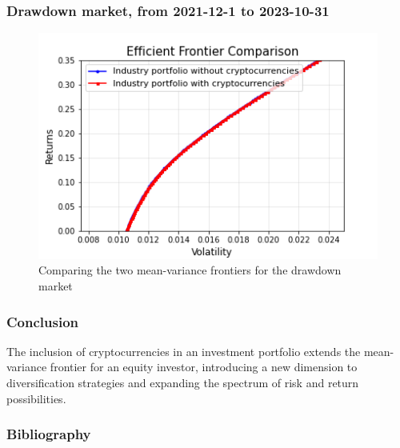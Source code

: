 \documentclass{beamer}
\begin{document}
\begin{frame}
\frametitle{Drawdown market, from 2021-12-1 to 2023-10-31}
\begin{figure}
    \centering
    \includegraphics[width=0.8\linewidth]{Figures/Efficient_Frontier_Comparison_Drawdown_Market.png}
    \caption{Comparing the two mean-variance frontiers for the drawdown market}
    \label{fig:drawdown}
\end{figure}
\end{frame}

\begin{frame}
\frametitle{Conclusion}
The inclusion of cryptocurrencies in an investment portfolio extends the mean-variance frontier for an equity investor, 
introducing a new dimension to diversification strategies and expanding the spectrum of risk and return possibilities. 
\nocite{wikiref}
\end{frame}

\begin{frame}
\frametitle{Bibliography}



\end{frame}
\end{document}
